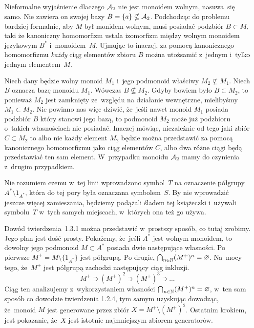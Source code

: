\documentclass[a4paper,11pt]{article}
\begin{document}
Nieformalne wyjaśnienie dlaczego $\mathcal{A}_{ 2 }$ nie jest monoidem
wolnym, nasuwa~się samo. Nie zawiera on swojej bazy
$B = \{ a \} \nsubseteq \mathcal{A}_{ 2 }$. Podchodząc do problemu bardziej
formalnie, aby $M$ był monidem wolnym, musi posiadać podzbiór
$B \subset M$, taki że kanoniczny homomorfizm ustala izomorfizm między
wolnym monoidem językowym $B^{ * }$ i~monoidem~$M$. Ujmując to
inaczej, za pomocą kanonicznego homomorfizmu \textit{każdy} ciąg
elementów zbioru $B$ można utożsamić z~jednym i~tylko jednym
elementem~$M$.

Niech dany będzie wolny monoid $M_{ 1 }$ i~jego podmonoid właściwy
$M_{ 2 } \nsubseteq M_{ 1 }$. Niech $B$ oznacza bazę monoidu
$M_{ 1 }$. Wówczas $B \nsubseteq M_{ 2 }$. Gdyby bowiem było
$B \subset M_{ 2 }$, to ponieważ $M_{ 2 }$ jest zamknięty ze~względu
na działanie wewnętrzne, mielibyśmy $M_{ 1 } \subset M_{ 2 }$. Nie
powinno nas więc dziwić, że~jeśli nawet monoid $M_{ 1 }$ posiada
podzbiór $B$ który stanowi jego bazą, to podmonoid $M_{ 2 }$ może już
podzbioru o~takich własnościach nie posiadać. Inaczej mówiąc,
niezależnie od tego jaki zbiór $C \subset M_{ 2 }$ to albo nie każdy
element $M_{ 2 }$ będzie można przedstawić za pomocą kanonicznego
homomorfizmu jako ciąg elementów $C$, albo dwa różne ciągi będą
przedstawiać ten sam element. W~przypadku monoidu $\mathcal{A}_{ 2 }$ mamy
do czynienia z~drugim przypadkiem.

\vspace{\spaceFour}





\start {} Nie rozumiem czemu w~tej linii wprowadzono
symbol~$T$ na oznaczenie półgrupy $A^{ * } \setminus 1_{ A^{ * } }$,
która do tej pory była oznaczana symbolem~$S$. By nie wprowadzić
jeszcze więcej zamieszania, będziemy podążali śladem tej książeczki
i~używali symbolu~$T$ w~tych samych miejscach, w~których ona też go
używa.

\vspace{\spaceFour}





\start {} Dowód twierdzenia~1.3.1 można przedstawić w~prostszy
sposób, co tutaj zrobimy. Jego plan jest dość prosty. Pokażemy,
że~jeśli $A^{ * }$ jest wolnym monoidem, to dowolny jego podmonoid
$M \subset A^{ * }$ posiada dwie następujące własności. Po pierwsze
$M^{ + } = M \setminus \{ 1_{ A^{ * } } \}$ jest półgrupą. Po drugie,
$\bigcap_{ n \in \mathbb{N} } ( M^{ + } )^{ n } = \varnothing$. Na~mocy tego,
że~$M^{ + }$ jest półgrupą zachodzi następujący ciąg inkluzji.
\begin{equation}
  \label{eq:Forys-Forys-66}
  M^{ + } \supset ( M^{ + } )^{ 2 } \supset ( M^{ + } )^{ 3 } \supset \ldots
\end{equation}
Ciąg ten analizujemy z~wykorzystaniem własności
$\bigcap_{ n \in \mathbb{N} } ( M^{ + } )^{ n } = \varnothing$, w~ten sam
sposób co dowodzie twierdzenia 1.2.4, tym samym uzyskując dowodząc,
że~monoid $M$ jest generowane przez zbiór
$X = M^{ + } \setminus ( M^{ + } )^{ 2 }$. Ostatnim krokiem, jest pokazanie,
że~$X$ jest istotnie najmniejszym zbiorem generatorów.
\end{document}
